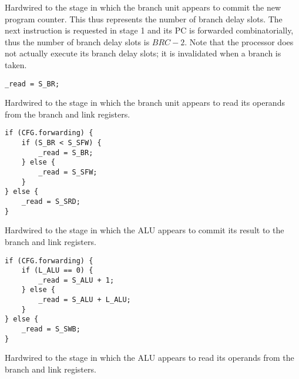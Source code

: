 Hardwired to the stage in which the branch unit appears to commit the new
program counter. This thus represents the number of branch delay slots. The next
instruction is requested in stage 1 and its PC is forwarded combinatorially,
thus the number of branch delay slots is $BRC - 2$. Note that the \rvex{}
processor does not actually execute its branch delay slots; it is invalidated
when a branch is taken.

\reset{****}
\implementation{}
\begin{lstlisting}
_read = S_BR;
\end{lstlisting}

Hardwired to the stage in which the branch unit appears to read its operands 
from the branch and link registers.

\reset{****}
\implementation{}
\begin{lstlisting}
if (CFG.forwarding) {
    if (S_BR < S_SFW) {
        _read = S_BR;
    } else {
        _read = S_SFW;
    }
} else {
    _read = S_SRD;
}
\end{lstlisting}

Hardwired to the stage in which the ALU appears to commit its result to the
branch and link registers.

\reset{****}
\implementation{}
\begin{lstlisting}
if (CFG.forwarding) {
    if (L_ALU == 0) {
        _read = S_ALU + 1;
    } else {
        _read = S_ALU + L_ALU;
    }
} else {
    _read = S_SWB;
}
\end{lstlisting}

Hardwired to the stage in which the ALU appears to read its operands from the
branch and link registers.

